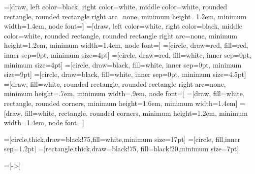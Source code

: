 =[draw, left color=black, right color=white, middle color=white, rounded rectangle, rounded rectangle right arc=none, minimum height=1.2em, minimum width=1.4em, node font={\scriptsize}]
=[draw, left color=white, right color=black, middle color=white, rounded rectangle, rounded rectangle right arc=none, minimum height=1.2em, minimum width=1.4em, node font={\scriptsize}]
=[circle, draw=red, fill=red, inner sep=0pt, minimum size=4pt]
=[circle, draw=red, fill=white, inner sep=0pt, minimum size=4pt]
=[circle, draw=black, fill=white, inner sep=0pt, minimum size=9pt]
=[circle, draw=black, fill=white, inner sep=0pt, minimum size=4.5pt]
=[draw, fill=white, rounded rectangle, rounded rectangle right arc=none, minimum height=.7em, minimum width=.9em, node font={\scriptsize}]
=[draw, fill=white, rectangle, rounded corners, minimum height=1.6em, minimum width=1.4em]
=[draw, fill=white, rectangle, rounded corners, minimum height=1.2em, minimum width=1.4em, node font={\scriptsize}]


=[circle,thick,draw=black!75,fill=white,minimum size=17pt]
=[circle, fill,inner sep=1.2pt]
=[rectangle,thick,draw=black!75,
  			  fill=black!20,minimum size=7pt]

=[->]

\newcommand{\tikzfig}[1]{
\tikzset{x=1em, y=2.1ex}
\InputIfFileExists{#1.tikz}{}{}
\tikzset{x=1em, y=1.5ex}
}

\newcommand{\ctikzfig}[1]{%
\begin{center}
  \tikzfig{#1}
\end{center}}


\newcommand{\eqtikzfig}[1]{%
\begin{equation}
  \tikzfig{#1}
\end{equation}}

